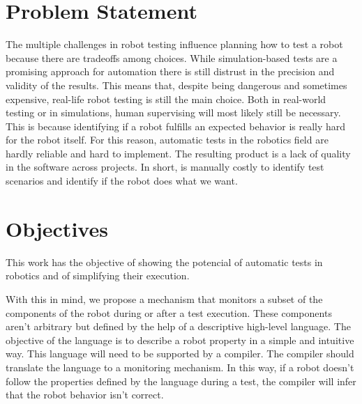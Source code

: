 \section{Problem Statement}
\label{sec:problem}

The multiple challenges in robot testing influence planning 
how to test a robot because there are tradeoffs among choices.
While simulation-based tests are a promising approach for automation 
there is still distrust in the precision and validity of the results.
This means that, despite being dangerous and sometimes expensive, 
real-life robot testing is still the main choice.
Both in real-world testing or in simulations, 
human supervising will most likely still be necessary.
This is because identifying if a robot fulfills an expected 
behavior is really hard for the robot itself.
For this reason, automatic tests in the robotics field are 
hardly reliable and hard to implement.
The resulting product is a lack of quality in the software 
across projects.
In short, is manually costly to identify test scenarios 
and identify if the robot does what we want.


\section{Objectives}
\label{sec:objectives}

This work has the objective of showing the potencial of automatic 
tests in robotics and of simplifying their execution.




With this in mind, we propose a mechanism that monitors a subset of the components of the robot during or after a test execution.
These components aren't arbitrary but defined by the help of a descriptive high-level language.
The objective of the language is to describe a robot property in a simple and intuitive way.
This language will need to be supported by a compiler. 
The compiler should translate the language to a monitoring mechanism.
In this way, if a robot doesn't follow the properties defined by the language 
during a test, the compiler will infer that the robot behavior isn't correct. 

